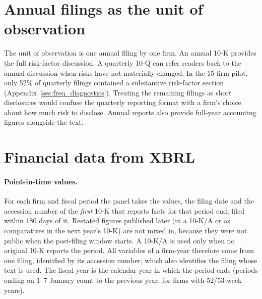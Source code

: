 \section{Annual filings as the unit of observation}
\label{sec:annual_vs_quarterly}

The unit of observation is one annual filing by one firm. An annual 10-K provides the full risk-factor discussion. A quarterly 10-Q can refer readers back to the annual discussion when risks have not materially changed. In the 15-firm pilot, only 52\% of quarterly filings contained a substantive risk-factor section (Appendix~\ref{sec:freq_diagnostics}). Treating the remaining filings as short disclosures would confuse the quarterly reporting format with a firm's choice about how much risk to disclose. Annual reports also provide full-year accounting figures alongside the text.

\section{Financial data from XBRL}
\label{sec:xbrl_tags}

\paragraph{Point-in-time values.} For each firm and fiscal period the panel
takes the values, the filing date and the accession number of the
\emph{first} 10-K that reports facts for that period end, filed within 180
days of it. Restated figures published later (in a 10-K/A or as comparatives
in the next year's 10-K) are not mixed in, because they were not public when
the post-filing window starts. A 10-K/A is used only when no original 10-K
reports the period. All variables of a firm-year therefore come from one
filing, identified by its accession number, which also identifies the
filing whose text is used. The fiscal year is the calendar year in which the
period ends (periods ending on 1--7 January count to the previous year, for
firms with 52/53-week years).

